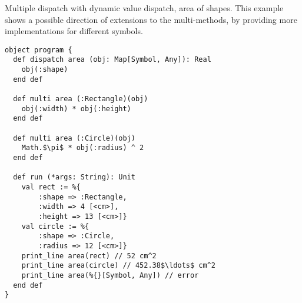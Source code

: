 \example Multiple dispatch with dynamic value dispatch, area of shapes. This example shows a possible direction of extensions to the multi-methods, by providing more implementations for different symbols. 
\begin{lstlisting}
object program {
  def dispatch area (obj: Map[Symbol, Any]): Real
    obj(:shape)
  end def
  
  def multi area (:Rectangle)(obj)
    obj(:width) * obj(:height)
  end def
  
  def multi area (:Circle)(obj)
    Math.$\pi$ * obj(:radius) ^ 2
  end def
  
  def run (*args: String): Unit
    val rect := %{
        :shape => :Rectangle,
        :width => 4 [<cm>],
        :height => 13 [<cm>]}
    val circle := %{
        :shape => :Circle,
        :radius => 12 [<cm>]}
    print_line area(rect) // 52 cm^2
    print_line area(circle) // 452.38$\ldots$ cm^2
    print_line area(%{}[Symbol, Any]) // error
  end def
}
\end{lstlisting}















